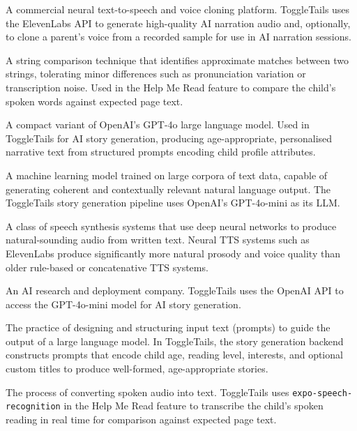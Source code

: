 \begin{description}[leftmargin=2.5cm, style=nextline]

\item[\textbf{ElevenLabs}]
A commercial neural text-to-speech and voice cloning platform. ToggleTails
uses the ElevenLabs API to generate high-quality AI narration audio and,
optionally, to clone a parent's voice from a recorded sample for use in AI
narration sessions.

\item[\textbf{Fuzzy Matching}]
A string comparison technique that identifies approximate matches between
two strings, tolerating minor differences such as pronunciation variation or
transcription noise. Used in the Help Me Read feature to compare the child's
spoken words against expected page text.

\item[\textbf{GPT-4o-mini}]
A compact variant of OpenAI's GPT-4o large language model. Used in
ToggleTails for AI story generation, producing age-appropriate, personalised
narrative text from structured prompts encoding child profile attributes.

\item[\textbf{Large Language Model (LLM)}]
A machine learning model trained on large corpora of text data, capable of
generating coherent and contextually relevant natural language output. The
ToggleTails story generation pipeline uses OpenAI's GPT-4o-mini as its LLM.

\item[\textbf{Neural Text-to-Speech (Neural TTS)}]
A class of speech synthesis systems that use deep neural networks to produce
natural-sounding audio from written text. Neural TTS systems such as
ElevenLabs produce significantly more natural prosody and voice quality than
older rule-based or concatenative TTS systems.

\item[\textbf{OpenAI}]
An AI research and deployment company. ToggleTails uses the OpenAI API to
access the GPT-4o-mini model for AI story generation.

\item[\textbf{Prompt Engineering}]
The practice of designing and structuring input text (prompts) to guide the
output of a large language model. In ToggleTails, the story generation backend
constructs prompts that encode child age, reading level, interests, and
optional custom titles to produce well-formed, age-appropriate stories.

\item[\textbf{Speech Recognition}]
The process of converting spoken audio into text. ToggleTails uses
\texttt{expo-speech-recognition} in the Help Me Read feature to transcribe the
child's spoken reading in real time for comparison against expected page text.


\end{description}
